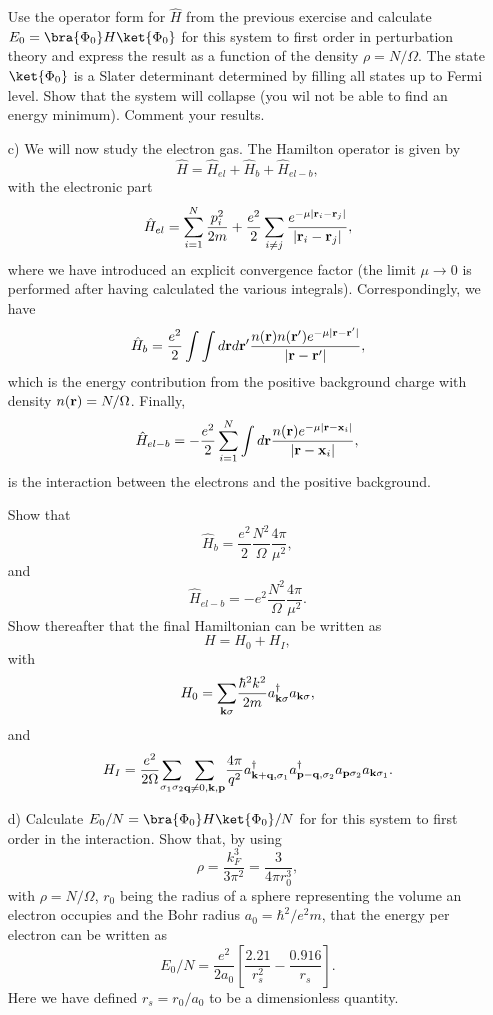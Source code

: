 \begin{prob}
\begin{enumerate}
Use the operator form for $\hat{H}$ from the previous exercise and calculate
$E_0=\bra{\Phi_{0}}H\ket{\Phi_{0}}$ for this system to first order in perturbation theory
and express the result as a function of the density $\rho=N/\Omega$. 
The state $\ket{\Phi_{0}}$  is a Slater determinant determined by filling all states up to Fermi level.
Show that the system will collapse (you wil not be able to find an energy minimum). Comment your results.
\item[c)] We will now study the electron gas. The Hamilton operator is given by
\[
\hat{H}=\hat{H}_{el}+\hat{H}_{b}+\hat{H}_{el-b},
\]
with the electronic part
\[
\hat{H}_{el}=\sum_{i=1}^N\frac{p_i^2}{2m}+\frac{e^2}{2}\sum_{i\ne j}\frac{e^{-\mu |{\bf r}_i-{\bf r}_j|}}{|{\bf r}_i-{\bf r}_j|},
\]
where we have introduced an explicit convergence factor
(the limit $\mu\rightarrow 0$ is performed after having calculated the various integrals).
Correspondingly, we have
\[
\hat{H}_{b}=\frac{e^2}{2}\int\int d{\bf r}d{\bf r}'\frac{n({\bf r})n({\bf r}')e^{-\mu |{\bf r}-{\bf r}'|}}{|{\bf r}-{\bf r}'|},
\]
which is the energy contribution from the positive background charge with density
$n({\bf r})=N/\Omega$. Finally,
\[
\hat{H}_{el-b}=-\frac{e^2}{2}\sum_{i=1}^N\int d{\bf r}\frac{n({\bf r})e^{-\mu |{\bf r}-{\bf x}_i|}}{|{\bf r}-{\bf x}_i|},
\]
is the interaction between the electrons and the positive background.

Show that
\[
\hat{H}_{b}=\frac{e^2}{2}\frac{N^2}{\Omega}\frac{4\pi}{\mu^2},
\]
and
\[
\hat{H}_{el-b}=-e^2\frac{N^2}{\Omega}\frac{4\pi}{\mu^2}.
\]
Show thereafter that the final Hamiltonian can be written as 
\[
H=H_{0}+H_{I},
\]
with
\[
H_{0}={\displaystyle\sum_{{\bf k}\sigma}}
\frac{\hbar^{2}k^{2}}{2m}a_{{\bf k}\sigma}^{\dagger}
a_{{\bf k}\sigma},
\]
and
\[
H_{I}=\frac{e^{2}}{2\Omega}{\displaystyle\sum_{\sigma_{1}
\sigma_{2}}}{\displaystyle
\sum_{{\bf q}\neq 0,{\bf k},{\bf p}}}\frac{4\pi}{q^{2}}
a_{{\bf k}+{\bf q},\sigma_{1}}^{\dagger}
a_{{\bf p}-{\bf q},\sigma_{2}}^{\dagger}
a_{{\bf p}\sigma_{2}}a_{{\bf k}\sigma_{1}}.
\] 
\item[d)] Calculate
$E_0/N=\bra{\Phi_{0}}H\ket{\Phi_{0}}/N$ for
for this system to first order in the interaction.
Show that, by using
\[
\rho= \frac{k_F^3}{3\pi^2}=\frac{3}{4\pi r_0^3},
\]
with $\rho=N/\Omega$, $r_0$
being the radius of a sphere representing the volume an electron occupies 
and the Bohr radius $a_0=\hbar^2/e^2m$, 
that the energy per electron can be written as 
\[
E_0/N=\frac{e^2}{2a_0}\left[\frac{2.21}{r_s^2}-\frac{0.916}{r_s}\right].
\]
Here we have defined
$r_s=r_0/a_0$ to be a dimensionless quantity.


\end{enumerate}
\end{prob}
